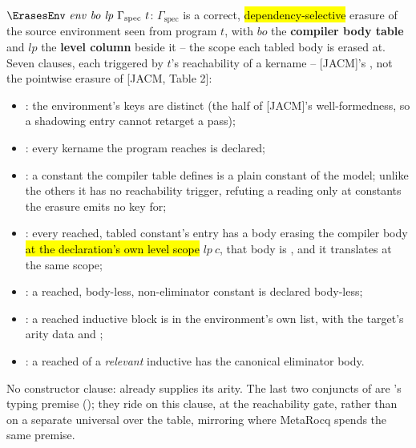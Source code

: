 \begin{definition}
\label{def:ErasesEnv}
\leanok
{}
 $\ErasesEnv\ \mathit{env}\ \mathit{bo}\ \mathit{lp}\ \Gamma_{\mathrm{spec}}\ t$: $\Gamma_{\mathrm{spec}}$ is a correct, \hl{dependency-selective} erasure of the source environment seen from program $t$, with $\mathit{bo}$ the \textbf{compiler body table} and $\mathit{lp}$ the \textbf{level column} beside it -- the scope each tabled body is erased at. Seven clauses, each triggered by $t$'s reachability of a kername -- [JACM]'s , not the pointwise erasure of [JACM, Table 2]:
\begin{itemize}
\item {}: the environment's keys are distinct (the  half of [JACM]'s well-formedness, so a shadowing entry cannot retarget a pass);
\item {}: every kername the program reaches is declared;
\item {}: a constant the compiler table defines is a plain constant of the model; unlike the others it has no reachability trigger, refuting a reading only at constants the erasure emits no key for;
\item {}: every reached, tabled constant's entry has a body erasing the compiler body \hl{at the declaration's own level scope} $\mathit{lp}\ c$, that body is , and it translates at the same scope;
\item {}: a reached, body-less, non-eliminator constant is declared body-less;
\item {}: a reached inductive block is in the environment's own list, with the target's arity data and ;
\item {}: a reached  of a \emph{relevant} inductive has the canonical eliminator body.
\end{itemize}
 No constructor clause:  already supplies its arity. The last two
conjuncts of  are 's typing premise
(); they ride on this clause, at the reachability gate, rather
than on a separate universal over the table, mirroring where MetaRocq spends the same premise.
\end{definition}

